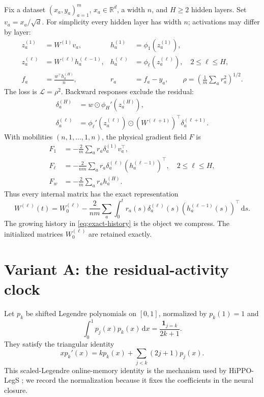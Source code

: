 \documentclass[11pt]{article}
\theoremstyle{definition}
\theoremstyle{remark}
\newcommand{\R}{\mathbb{R}}
\newcommand{\cL}{\mathcal{L}}
\newcommand{\od}{\mathbin{\odot}}
\newcommand{\dd}{\,\mathrm{d}}
\begin{document}
Fix a dataset $(x_a,y_a)_{a=1}^m$, $x_a\in\R^d$, a width $n$, and $H\ge2$
hidden layers.  Set $v_a=x_a/\sqrt d$.  For simplicity every hidden layer has
width $n$; activations may differ by layer:
\begin{align}
 z_a^{(1)}&=W^{(1)}v_a,& h_a^{(1)}&=\phi_1(z_a^{(1)}),\nonumber\\
 z_a^{(\ell)}&=W^{(\ell)}h_a^{(\ell-1)},&
 h_a^{(\ell)}&=\phi_\ell(z_a^{(\ell)}),\quad 2\le\ell\le H,\\
 f_a&=\frac{w^\top h_a^{(H)}}{n},& r_a&=f_a-y_a,\qquad
 \rho=\left(\frac1m\sum_a r_a^2\right)^{1/2}.\nonumber
\end{align}
The loss is $\cL=\rho^2$.  Backward responses exclude the residual:
\begin{align}
 \delta_a^{(H)}&=w\od\phi_H'(z_a^{(H)}),\nonumber\\
 \delta_a^{(\ell)}&=\phi_\ell'(z_a^{(\ell)})\od
 (W^{(\ell+1)})^\top\delta_a^{(\ell+1)}.
\end{align}
With mobilities $(n,1,\ldots,1,n)$, the physical gradient field $F$ is
\begin{align}
 F_1&=-\frac2m\sum_a r_a\delta_a^{(1)}v_a^\top,\nonumber\\
 F_\ell&=-\frac{2}{nm}\sum_a r_a\delta_a^{(\ell)}
 (h_a^{(\ell-1)})^\top,\quad 2\le\ell\le H,\label{eq:dense-flow}\\
 F_w&=-\frac2m\sum_a r_a h_a^{(H)}.\nonumber
\end{align}
Thus every internal matrix has the exact representation
\begin{equation}
 W^{(\ell)}(t)=W_0^{(\ell)}-\frac{2}{nm}\sum_a
 \int_0^t r_a(s)\delta_a^{(\ell)}(s)
 (h_a^{(\ell-1)}(s))^\top\dd s.                 \label{eq:exact-history}
\end{equation}
The growing history in \eqref{eq:exact-history} is the object we compress.
The initialized matrices $W_0^{(\ell)}$ are retained exactly.

\section{Variant A: the residual-activity clock}
\label{sec:old-clock}

Let $p_k$ be shifted Legendre polynomials on $[0,1]$, normalized by
$p_k(1)=1$ and
\[
 \int_0^1p_j(x)p_k(x)\dd x=\frac{\mathbf 1_{j=k}}{2k+1}.
\]
They satisfy the triangular identity
\begin{equation}
 x p_k'(x)=k p_k(x)+\sum_{j<k}(2j+1)p_j(x).          \label{eq:triangular}
\end{equation}
This scaled-Legendre online-memory identity is the mechanism used by
HiPPO-LegS \citep{gu2020hippo}; we record the normalization because it fixes
the coefficients in the neural closure.
\end{document}

